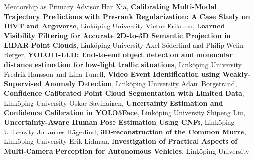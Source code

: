 \usecvrubricnumberedprefix
\begin{rubric}{Mentorship as Primary Advisor}
\entry*[2026] Han Xia, \textbf{Calibrating Multi-Modal Trajectory Predictions with Pre-rank Regularization: A Case Study on HiVT and Argoverse}, Linköping University
\entry*[2025] Victor Eriksson, \textbf{Learned Visibility Filtering for Accurate 2D-to-3D Semantic Projection in LiDAR Point Clouds}, Linköping University
\entry*[2025] Axel Söderlind and Philip Welin-Berger, \textbf{YOLO11-LLD: End-to-end object detection and monocular distance estimation for low-light traffic situations}, Linköping University
\entry*[2025] Fredrik Hansson and Lina Tunell, \textbf{Video Event Identification using Weakly-Supervised Anomaly Detection}, Linköping University
\entry*[2024] Adam Borgstrand, \textbf{Confidence Calibrated Point Cloud Segmentation with Limited Data}, Linköping University
\entry*[2024] Oskar Savinainen, \textbf{Uncertainty Estimation and Confidence Calibration in YOLO5Face}, Linköping University
\entry*[2024] Shipeng Liu, \textbf{Uncertainty-Aware Human Pose Estimation Using CNFs}, Linköping University
\entry*[2023] Johannes Hägerlind, \textbf{3D-reconstruction of the Common Murre}, Linköping University
\entry*[2023] Erik Lidman, \textbf{Investigation of Practical Aspects of Multi-Camera Perception for Autonomous Vehicles}, Linköping University
\end{rubric}
\usecvrubricbookmarkprefix
